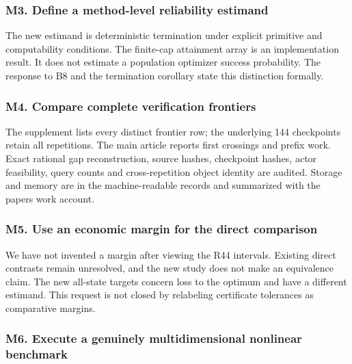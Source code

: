 \documentclass[ecta,nameyear,draft]{econsocart}
\begin{document}
\hypertarget{m3-define-a-method-level-reliability-estimand}{%
\subsubsection{M3. Define a method-level reliability
estimand}\label{m3-define-a-method-level-reliability-estimand}}

The new estimand is deterministic termination under explicit primitive
and computability conditions. The finite-cap attainment array is an
implementation result. It does not estimate a population optimizer
success probability. The response to B8 and the termination corollary
state this distinction formally.

\hypertarget{m4-compare-complete-verification-frontiers}{%
\subsubsection{M4. Compare complete verification
frontiers}\label{m4-compare-complete-verification-frontiers}}

The supplement lists every distinct frontier row; the underlying 144
checkpoints retain all repetitions. The main article reports first
crossings and prefix work. Exact rational gap reconstruction, source
hashes, checkpoint hashes, actor feasibility, query counts and
cross-repetition object identity are audited. Storage and memory are in
the machine-readable records and summarized with the
paper\textquotesingle s work account.

\hypertarget{m5-use-an-economic-margin-for-the-direct-comparison}{%
\subsubsection{M5. Use an economic margin for the direct
comparison}\label{m5-use-an-economic-margin-for-the-direct-comparison}}

We have not invented a margin after viewing the R44 intervals. Existing
direct contrasts remain unresolved, and the new study does not make an
equivalence claim. The new all-state targets concern loss to the optimum
and have a different estimand. This request is not closed by relabeling
certificate tolerances as comparative margins.

\hypertarget{m6-execute-a-genuinely-multidimensional-nonlinear-benchmark}{%
\subsubsection{M6. Execute a genuinely multidimensional nonlinear
benchmark}\label{m6-execute-a-genuinely-multidimensional-nonlinear-benchmark}}
\end{document}

